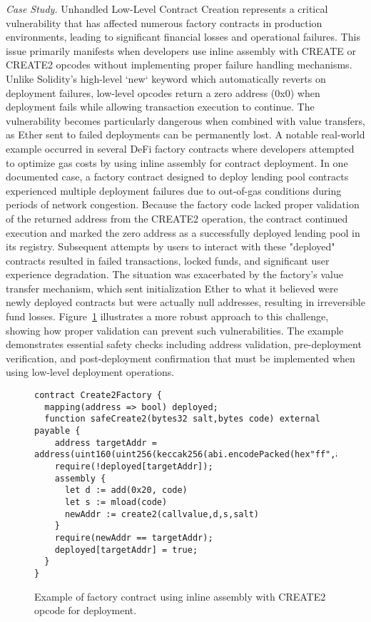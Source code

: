 \documentclass[acmsmall, screen]{acmart}
\begin{document}
	\textit{Case Study.} Unhandled Low-Level Contract Creation represents a critical vulnerability
	that has affected numerous factory contracts in production environments, leading to significant financial
	losses and operational failures. This issue primarily manifests when developers use inline
	assembly with CREATE or CREATE2 opcodes without implementing proper failure handling mechanisms.
	Unlike Solidity's high-level `new` keyword which automatically reverts on deployment failures,
	low-level opcodes return a zero address (0x0) when deployment fails while allowing transaction
	execution to continue. The vulnerability becomes particularly dangerous when combined with value
	transfers, as Ether sent to failed deployments can be permanently lost. A notable real-world example
	occurred in several DeFi factory contracts where developers attempted to optimize gas costs by using
	inline assembly for contract deployment. In one documented case, a factory contract designed to deploy
	lending pool contracts experienced multiple deployment failures due to out-of-gas conditions during
	periods of network congestion. Because the factory code lacked proper validation of the returned
	address from the CREATE2 operation, the contract continued execution and marked the zero address
	as a successfully deployed lending pool in its registry. Subsequent attempts by users to
	interact with these "deployed" contracts resulted in failed transactions, locked funds, and
	significant user experience degradation. The situation was exacerbated by the factory's value transfer
	mechanism, which sent initialization Ether to what it believed were newly deployed contracts but
	were actually null addresses, resulting in irreversible fund losses. Figure~\ref{lst:lowlevel}
	illustrates a more robust approach to this challenge, showing how proper validation can prevent such
	vulnerabilities. The example demonstrates essential safety checks including address validation, pre-deployment
	verification, and post-deployment confirmation that must be implemented when using low-level
	deployment operations.

	\begin{figure}[t]
		\begin{minipage}{0.95\linewidth}
			\begin{lstlisting}
contract Create2Factory {
  mapping(address => bool) deployed;
  function safeCreate2(bytes32 salt,bytes code) external payable {
    address targetAddr = address(uint160(uint256(keccak256(abi.encodePacked(hex"ff",address(this),salt,keccak256(abi.encodePacked(code)))))));
    require(!deployed[targetAddr]);
    assembly {
      let d := add(0x20, code)
      let s := mload(code)
      newAddr := create2(callvalue,d,s,salt)
    }
    require(newAddr == targetAddr);
    deployed[targetAddr] = true;
  }
}
			\end{lstlisting}
		\end{minipage}
		\caption{Example of factory contract using inline assembly with CREATE2 opcode for
		deployment.}
		\label{lst:lowlevel}
	\end{figure}
\end{document}
